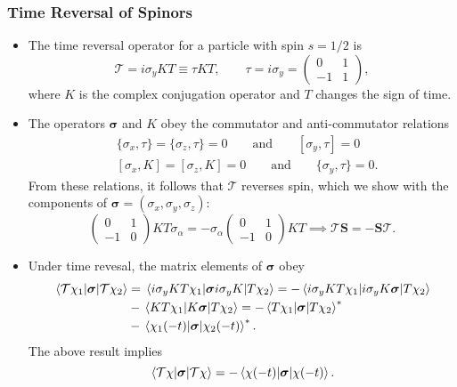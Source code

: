 \documentclass[11pt, a4paper]{article}
\newcommand{\eqtext}[1]{\qquad \text{#1} \qquad}
\renewcommand{\vec}[1]{\bm{#1}}  %
\renewcommand{\S}{\vec{S}}  %
\newcommand{\T}{\mathcal{T}}  %
\begin{document}
\subsubsection{Time Reversal of Spinors}
\begin{itemize}
	\item The time reversal operator for a particle with spin $ s = 1/2 $ is 
	\begin{equation*}
		\T = i \sigma_{y} KT \equiv \tau KT, \qquad \tau = i \sigma_{y} =
		\begin{pmatrix}
			0 & 1\\
			-1 & 1
		\end{pmatrix},
	\end{equation*}
	where $ K $ is the complex conjugation operator and $ T $ changes the sign of time. 

    \item The operators $ \vec{\sigma} $ and $ K $ obey the commutator and anti-commutator relations
	\begin{align*}
		&\{\sigma_{x}, \tau\} = \{\sigma_{z}, \tau\} = 0 \eqtext{and} [\sigma_{y}, \tau] = 0\\
		&[\sigma_{x}, K] = [\sigma_{z}, K] = 0 \eqtext{and} \{\sigma_{y}, \tau\} = 0.
	\end{align*}
	From these relations, it follows that $ \T $ reverses spin, which we show with the components of $ \vec{\sigma} = (\sigma_{x}, \sigma_{y}, \sigma_{z}) $:
	\begin{equation*}
		\begin{pmatrix}
			0 & 1\\
			-1 & 0
		\end{pmatrix}
		K T \sigma_{\alpha} = - \sigma_{\alpha}
		\begin{pmatrix}
			0 & 1\\
			-1 & 0
		\end{pmatrix}
		KT
		\implies \T \S = - \S \T.
	\end{equation*}
	
	\item Under time revesal, the matrix elements of $ \vec{\sigma} $ obey
	\begin{align*}
		\mel{\T \chi_{1}}{\vec{\sigma}}{\T \chi_{2}} &= \mel{i\sigma_{y}KT\chi_{1}}{\vec{\sigma}i \sigma_{y}K}{T\chi_{2}} = - \mel{i\sigma_{y}KT\chi_{1}}{i \sigma_{y}K \vec{\sigma}}{T\chi_{2}} \\
		& - \mel{KT\chi_{1}}{K \vec{\sigma}}{T\chi_{2}} = -\mel{T\chi_{1}}{\vec{\sigma}}{T\chi_{2}}^{*}\\
		& -\mel{\chi_{1}(-t)}{\vec{\sigma}}{\chi_{2}(-t)}^{*}.
	\end{align*}
	The above result implies
	\begin{equation*}
		\mel{\T \chi}{\vec{\sigma}}{\T \chi} = -\mel{\chi(-t)}{\vec{\sigma}}{\chi(-t)}.
	\end{equation*}
	

\end{itemize}
\end{document}
